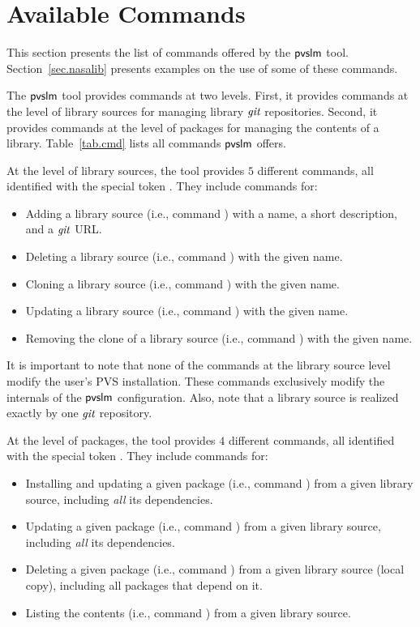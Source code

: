 \section{Available Commands}
\label{sec.cmd}

This section presents the list of commands offered by the $\textsf{pvslm}$
tool. Section~\ref{sec.nasalib} presents examples on the use of some
of these commands.

The $\textsf{pvslm}$ tool provides commands at two levels. First, it provides
commands at the level of library sources for managing library $\textit{git}$
repositories.  Second, it provides commands at the level of packages
for managing the contents of a library. Table~\ref{tab.cmd} lists all
commands $\textsf{pvslm}$ offers.

At the level of library sources, the tool provides $5$ different
commands, all identified with the special token . They
include commands for:

\begin{itemize}
  \item Adding a library source (i.e., command ) with a
    name, a short description, and a $\textit{git}$ URL.
  \item Deleting a library source (i.e., command ) with
    the given name.
  \item Cloning a library source (i.e., command ) with the
    given name.
  \item Updating a library source (i.e., command ) with
    the given name.
  \item Removing the clone of a library source (i.e., command
    ) with the given name.
\end{itemize}

It is important to note that none of the commands at the library
source level modify the user's PVS installation. These commands
exclusively modify the internals of the $\textsf{pvslm}$ configuration. Also,
note that a library source is realized exactly by one $\textit{git}$
repository.

At the level of packages, the tool provides $4$ different
commands, all identified with the special token . They
include commands for:

\begin{itemize}
  \item Installing and updating a given package (i.e., command
    ) from a given library source, including {\em all} its
    dependencies.
  \item Updating a given package (i.e., command ) from a given
    library source, including {\em all} its dependencies.
  \item Deleting a given package (i.e., command ) from a given
    library source (local copy), including all packages that depend on
    it.
  \item Listing the contents (i.e., command ) from a given
    library source.
\end{itemize}

